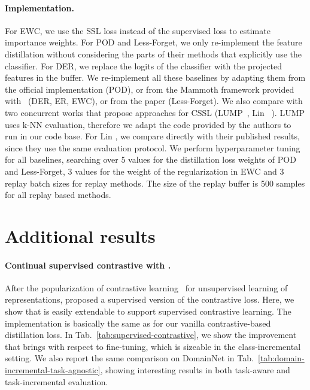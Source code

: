 \paragraph{Implementation.} For EWC, we use the SSL loss instead of the supervised loss to estimate importance weights. For POD and Less-Forget, we only re-implement the feature distillation without considering the parts of their methods that explicitly use the classifier. For DER, we replace the logits  of the classifier with the projected features in the buffer. We re-implement all these baselines by adapting them from the official implementation (POD), or from the Mammoth framework provided with~\cite{buzzega2020dark} (DER, ER, EWC), or from the paper (Less-Forget). We also compare with two concurrent works that propose approaches for CSSL (LUMP~\cite{madaan2021rethinking}, Lin \etal~\cite{lin2021continual}). LUMP uses k-NN evaluation, therefore we adapt the code provided by the authors to run in our code base. For Lin \etal, we compare directly with their published results, since they use the same evaluation protocol. We perform hyperparameter tuning for all baselines, searching over 5 values for the distillation loss weights of POD and Less-Forget, 3 values for the weight of the regularization in EWC and 3 replay batch sizes for replay methods. The size of the replay buffer is 500 samples for all replay based methods. 


\section{Additional results}
\paragraph{Continual supervised contrastive with \name{}.} After the popularization of contrastive learning~\cite{chen2020simple, he2020momentum} for unsupervised learning of representations, \cite{khosla2020supervised} proposed a supervised version of the contrastive loss. Here, we show that \name{} is easily extendable to support supervised contrastive learning. The implementation is basically the same as for our vanilla contrastive-based distillation loss. In Tab.~\ref{tab:supervised-contrastive}, we show the improvement that \name{} brings with respect to fine-tuning, which is sizeable in the class-incremental setting. We also report the same comparison on DomainNet in Tab.~\ref{tab:domain-incremental-task-agnostic}, showing interesting results in both task-aware and task-incremental evaluation.

